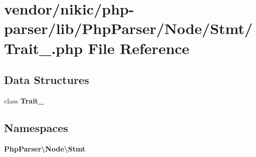 \section{vendor/nikic/php-\/parser/lib/\+Php\+Parser/\+Node/\+Stmt/\+Trait\+\_\+.php File Reference}
\label{_node_2_stmt_2_trait___8php}
\subsection*{Data Structures}
\begin{DoxyCompactItemize}
\item 
class {\bf Trait\+\_\+}
\end{DoxyCompactItemize}
\subsection*{Namespaces}
\begin{DoxyCompactItemize}
\item 
 {\bf Php\+Parser\textbackslash{}\+Node\textbackslash{}\+Stmt}
\end{DoxyCompactItemize}
